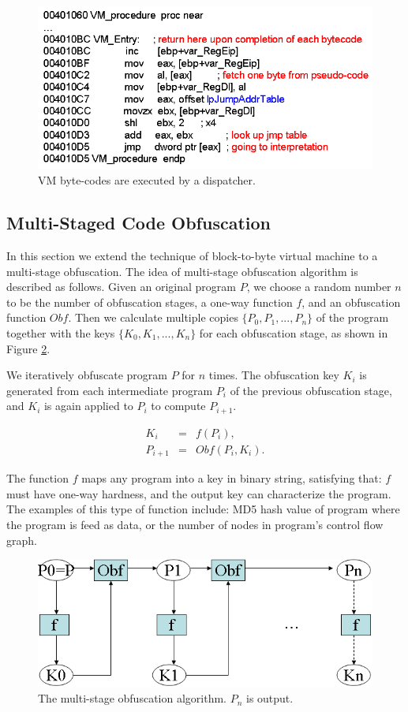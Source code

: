 \documentclass{../style/llncs}                   %
\begin{document}
\begin{figure}  \centering
\includegraphics[width=0.7\columnwidth]{./figure/fig_obf_dispatcher}
\caption{VM byte-codes are executed by a dispatcher.}
\label{fig_obf_dispatcher}
\end{figure}




\subsection{Multi-Staged Code Obfuscation}

In this section we extend the technique of block-to-byte virtual machine to
a multi-stage obfuscation.
The idea of multi-stage obfuscation algorithm is described as follows.
Given an original program $P$, we choose a random number $n$ to be
the number of obfuscation stages, a one-way function $f$, and
an obfuscation function $Obf$. Then we calculate multiple copies
$\{P_0, P_1,...,P_n\}$ of
the program together with the keys $\{K_0,K_1,...,K_n\}$
for each obfuscation stage, as shown in Figure \ref{fig_obf_algo}.

We iteratively obfuscate program $P$ for $n$ times.
The obfuscation key $K_i$ is generated from each intermediate program
$P_i$ of the previous obfuscation stage, and $K_i$ is again applied to $P_i$ to
compute $P_{i+1}$.

\begin{eqnarray*}
  K_i     &=& f(P_i), \\
  P_{i+1} &=& Obf(P_i, K_i).
\end{eqnarray*}

The function $f$ maps any program into a key in binary string, satisfying
that: $f$ must have one-way hardness, and the output key can characterize
the program. The examples of this type of function include: MD5 hash value
of program where the program is feed as data, or the number of nodes in program's
control flow graph.

\begin{figure}  \centering
\includegraphics[width=0.7\columnwidth]{./figure/fig_obf_algo}
\caption{The multi-stage obfuscation algorithm. $P_n$ is output.}
\label{fig_obf_algo}
\end{figure}
\end{document}

